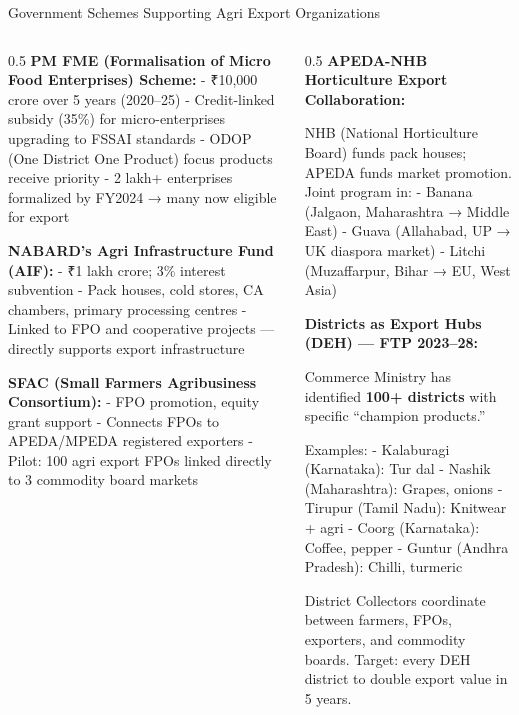 \documentclass[
  ignorenonframetext,
  aspectratio=169,
]{beamer}
\makeatletter
\let\quarto@originallabel\label
\DeclareRobustCommand*{\label}[1]{\quarto@originallabel{#1}}
\makeatother
\begin{document}
\begin{frame}{Government Schemes Supporting Agri Export Organizations}
\label{government-schemes-supporting-agri-export-organizations}
\begin{columns}[T]
\begin{column}{0.5\linewidth}
\textbf{PM FME (Formalisation of Micro Food Enterprises) Scheme:} -
₹10,000 crore over 5 years (2020--25) - Credit-linked subsidy (35\%) for
micro-enterprises upgrading to FSSAI standards - ODOP (One District One
Product) focus products receive priority - 2 lakh+ enterprises
formalized by FY2024 → many now eligible for export

\textbf{NABARD's Agri Infrastructure Fund (AIF):} - ₹1 lakh crore; 3\%
interest subvention - Pack houses, cold stores, CA chambers, primary
processing centres - Linked to FPO and cooperative projects --- directly
supports export infrastructure

\textbf{SFAC (Small Farmers Agribusiness Consortium):} - FPO promotion,
equity grant support - Connects FPOs to APEDA/MPEDA registered exporters
- Pilot: 100 agri export FPOs linked directly to 3 commodity board
markets
\end{column}

\begin{column}{0.5\linewidth}
\textbf{APEDA-NHB Horticulture Export Collaboration:}

NHB (National Horticulture Board) funds pack houses; APEDA funds market
promotion. Joint program in: - Banana (Jalgaon, Maharashtra → Middle
East) - Guava (Allahabad, UP → UK diaspora market) - Litchi
(Muzaffarpur, Bihar → EU, West Asia)

\textbf{Districts as Export Hubs (DEH) --- FTP 2023--28:}

Commerce Ministry has identified \textbf{100+ districts} with specific
``champion products.''

Examples: - Kalaburagi (Karnataka): Tur dal - Nashik (Maharashtra):
Grapes, onions - Tirupur (Tamil Nadu): Knitwear + agri - Coorg
(Karnataka): Coffee, pepper - Guntur (Andhra Pradesh): Chilli, turmeric

District Collectors coordinate between farmers, FPOs, exporters, and
commodity boards. Target: every DEH district to double export value in 5
years.
\end{column}
\end{columns}
\end{frame}
\end{document}
